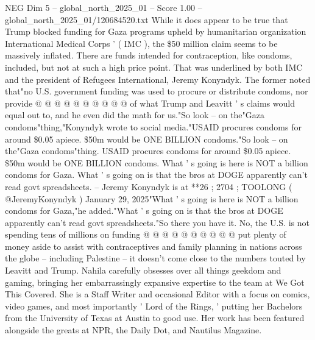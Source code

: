 \begin{textsample}{NEG Dim 5 – global\_north\_2025\_01 – Score 1.00 – global\_north\_2025\_01/120684520.txt}
While it does appear to be true that Trump blocked funding for Gaza programs upheld by humanitarian organization International Medical Corps ' ( IMC ), the \$50 million claim seems to be massively inflated.
There are funds intended for contraception, like condoms, included, but not at such a high price point.
That was underlined by both IMC and the president of Refugees International, Jeremy Konyndyk.
The former noted that"no U.S. government funding was used to procure or distribute condoms, nor provide @ @ @ @ @ @ @ @ @ @ of what Trump and Leavitt ' s claims would equal out to, and he even did the math for us."So look -- on the"Gaza condoms"thing,"Konyndyk wrote to social media."USAID procures condoms for around \$0.05 apiece. \$50m would be ONE BILLION condoms."So look -- on the"Gaza condoms"thing.
USAID procures condoms for around \$0.05 apiece. \$50m would be ONE BILLION condoms.
What ' s going is here is NOT a billion condoms for Gaza.
What ' s going on is that the bros at DOGE apparently can't read govt spreadsheets. -- Jeremy Konyndyk is at **26 ; 2704 ; TOOLONG ( @JeremyKonyndyk ) January 29, 2025"What ' s going is here is NOT a billion condoms for Gaza,"he added."What ' s going on is that the bros at DOGE apparently can't read govt spreadsheets."So there you have it.
No, the U.S. is not spending tens of millions on funding @ @ @ @ @ @ @ @ @ @ put plenty of money aside to assist with contraceptives and family planning in nations across the globe -- including Palestine -- it doesn't come close to the numbers touted by Leavitt and Trump.
Nahila carefully obsesses over all things geekdom and gaming, bringing her embarrassingly expansive expertise to the team at We Got This Covered.
She is a Staff Writer and occasional Editor with a focus on comics, video games, and most importantly ' Lord of the Rings, ' putting her Bachelors from the University of Texas at Austin to good use.
Her work has been featured alongside the greats at NPR, the Daily Dot, and Nautilus Magazine.

\end{textsample}
